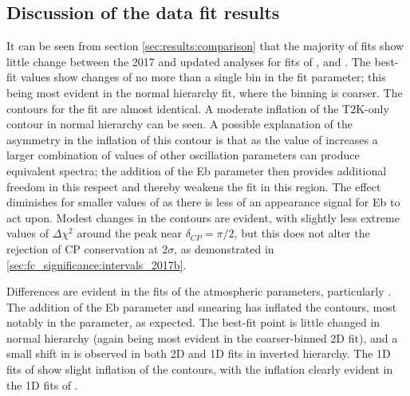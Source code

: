 \subsection {Discussion of the \RunPeriod data fit results}
\label{sec:results:discussion_2017b}

It can be seen from section \cref{sec:results:comparison} that the majority of fits show little change between the 2017 and updated analyses for fits of \ssqthonethree, \ssqthtwothree and \deltacp. The best-fit values show changes of no more than a single bin in the fit parameter; this being most evident in the normal hierarchy \appearance fit, where the binning is coarser. The contours for the \appearance fit are almost identical. A moderate inflation of the T2K-only \ssqthonethree contour in normal hierarchy can be seen. \color{blue}A possible explanation of the asymmetry in the inflation of this contour is that as the value of \ssqthonethree increases a larger combination of values of other oscillation parameters can produce equivalent spectra; the addition of the Eb parameter then provides additional freedom in this respect and thereby weakens the fit in this region. The effect diminishes for smaller values of \ssqthonethree as there is less of an appearance signal for Eb to act upon\color{black}. Modest changes in the \deltacp contours are evident, with slightly less extreme values of $\Delta\chi^2$ around the peak near $\delta_{CP}=\pi/2$, but this does not alter the rejection of CP conservation at $2\sigma$, as demonstrated in \cref{sec:fc_significance:intervals_2017b}.

Differences are evident in the fits of the atmospheric parameters, particularly \dmsq. The addition of the Eb parameter and \dmsq smearing has inflated the contours, most notably in the \dmsq parameter, as expected. The best-fit point is little changed in normal hierarchy (again being most evident in the coarser-binned 2D fit), and a small shift in \dmsq is observed in both 2D and 1D fits in inverted hierarchy. The 1D fits of \ssqthtwothree show slight inflation of the contours, with the inflation clearly evident in the 1D fits of \dmsq.

\clearpage


